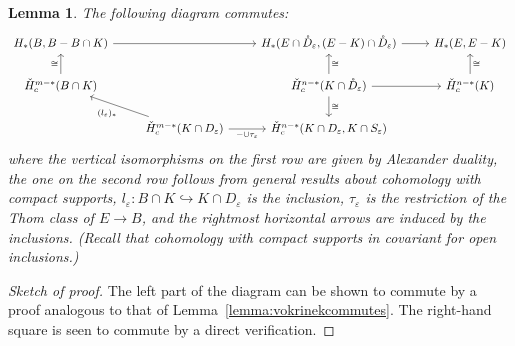 \documentclass[a4paper]{amsart}
\theoremstyle{plain}
\newtheorem{lemma}[theorem]{Lemma}
\theoremstyle{definition}
\newcommand{\CCH}{\check{H}_{c}}
\begin{document}
\begin{lemma}\label{lemma:vokrinekcommutes2}
The following diagram commutes:
\begin{equation}\label{eqn:diagramgeneralsetupVokrinek}
\begin{tikzcd}
{H_*(B,B-B \cap K)} \arrow[rr]         &                                                                                                        & {H_*(E \cap \mathring{D}_\varepsilon, (E-K) \cap \mathring{D}_\varepsilon)} \arrow[r]        & {H_*(E,E-K)}                      \\
\CCH^{m-*}(B\cap K) \arrow[u, "\cong"] &                                                                                                        & \CCH^{n-*}(K \cap \mathring{D}_\varepsilon) \arrow[d, "\cong"] \arrow[r] \arrow[u, "\cong"'] & \CCH^{n-*}(K) \arrow[u, "\cong"'] \\
                                       & \CCH^{m-*}(K \cap D_\varepsilon) \arrow[lu, "(l_\varepsilon)_*"] \arrow[r, "- \cup \tau_\varepsilon"'] & {\CCH^{n-*}(K \cap D_\varepsilon, K \cap S_\varepsilon)}                                     &                                  
\end{tikzcd}
\end{equation}
where the vertical isomorphisms on the first row are given by Alexander duality, the one on the second row follows from general results about cohomology with compact supports, $l_\varepsilon \colon B \cap K \hookrightarrow K \cap D_\varepsilon$ is the inclusion, $\tau_\varepsilon$ is the restriction of the Thom class of $E \to B$, and the rightmost horizontal arrows are induced by the inclusions. (Recall that cohomology with compact supports in covariant for open inclusions.)
\end{lemma}
\begin{proof}[Sketch of proof]
The left part of the diagram can be shown to commute by a proof analogous to that of Lemma~\ref{lemma:vokrinekcommutes}. The right-hand square is seen to commute by a direct verification.
\end{proof}
\end{document}
